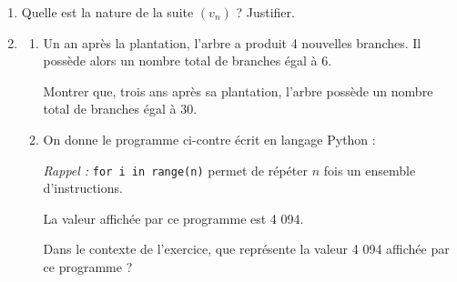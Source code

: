 \begin{enumerate}
\item Quelle est la nature de la suite $(v_n)$ ? Justifier.
\item \begin{enumerate}
\item Un an après la plantation, l'arbre a produit 4 nouvelles branches. Il possède alors un nombre total de branches égal à 6.

Montrer que, trois ans après sa plantation, l'arbre possède un nombre total de branches égal à 30.
\item On donne le programme ci-contre écrit en langage Python :

\begin{minipage}[t]{0.48\linewidth}
\emph{Rappel :} \texttt{for i in range(n)} permet de répéter $n$ fois un ensemble d'instructions.
\end{minipage}\hfill
\begin{minipage}[t]{0.42\linewidth}
\end{minipage}

La valeur affichée par ce programme est 4 094.

Dans le contexte de l'exercice, que représente la valeur 4 094 affichée par ce programme ?
\end{enumerate}
\end{enumerate}

\clearpage
